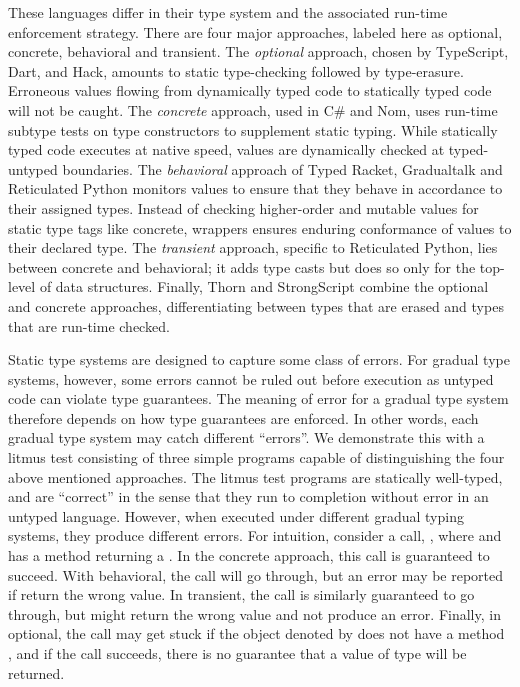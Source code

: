 \documentclass[USenglish]{tex/lipics-v2016}f
\begin{document}
\noindent These languages differ in their type system and the associated run-time
enforcement strategy. There are four major approaches, labeled here
as optional, concrete, behavioral and transient. The \emph{optional}
approach, chosen by TypeScript, Dart, and Hack, amounts to static
type-checking followed by type-erasure.  Erroneous values flowing from
dynamically typed code to statically typed code will not be caught. The
\emph{concrete} approach, used in C\# and Nom, uses run-time subtype tests on
type constructors to supplement static typing.  While statically typed code
executes at native speed, values are dynamically checked 
at typed-untyped boundaries. The \emph{behavioral} approach of Typed Racket, Gradualtalk and
Reticulated Python monitors values to ensure that they behave in accordance
to their assigned types. Instead of checking higher-order and mutable values for static
type tags like concrete, wrappers ensures enduring conformance of values to their declared type.
The \emph{transient} approach, specific to
Reticulated Python, lies between concrete and behavioral; it adds type casts
but does so only for the top-level of data structures. Finally, Thorn and
StrongScript combine the optional and concrete approaches,
differentiating between types that are erased and types that are run-time
checked.

Static type systems are designed to capture some class of errors. For
gradual type systems, however, some errors cannot be ruled out before
execution as untyped code can violate type guarantees. The meaning of error
for a gradual type system therefore depends on how type guarantees are
enforced.  In other words, each gradual type system may catch different
``errors''.  We demonstrate this with a litmus test consisting of three
simple programs capable of distinguishing the four above mentioned
approaches.  The litmus test programs are statically well-typed, and are
``correct'' in the sense that they run to completion without error in an
untyped language. However, when executed under different gradual typing
systems, they produce different errors. For intuition, consider a call,
, where \EM{\x:\C} and \C has a method \m returning a \D.  In
the concrete approach, this call is guaranteed to succeed. With behavioral,
the call will go through, but an error may be reported if \m return the
wrong value. In transient, the call is similarly guaranteed to go through,
but might return the wrong value and not produce an error.  Finally, in
optional, the call may get stuck if the object denoted by \x does not have a
method \m, and if the call succeeds, there is no guarantee that a value of
type \D will be returned.
\end{document}

